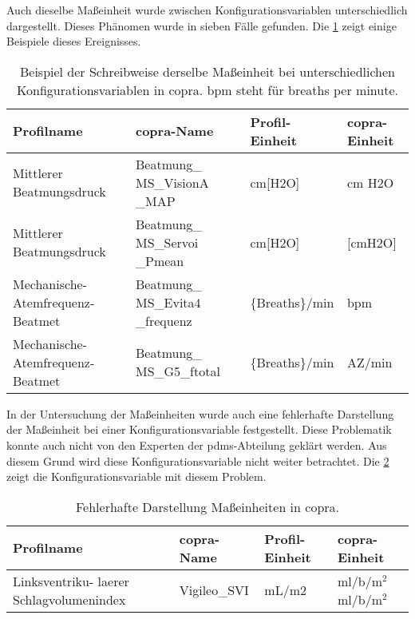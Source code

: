 Auch dieselbe Maßeinheit wurde zwischen Konfigurationsvariablen unterschiedlich dargestellt. Dieses Phänomen wurde in sieben Fälle gefunden. Die \ref{tab:unitscopra} zeigt einige Beispiele dieses Ereignisses.

\clearpage

\begin{table}[ht]
	\centering
	\caption[Beispiel der Schreibweise derselbe Maßeinheit in \acs{copra}]{Beispiel der Schreibweise derselbe Maßeinheit bei unterschiedlichen Konfigurationsvariablen in \acs{copra}. bpm steht für \glqq breaths per minute\grqq{}.}
	\label{tab:unitscopra}
	\begin{tabular}{|p{3cm}|p{3cm}|l|l|} \hline
		\bfseries Profilname & \bfseries \ac{copra}-Name & \bfseries Profil-Einheit &  \bfseries \ac{copra}-Einheit \\ \hline
		Mittlerer Beatmungsdruck & Beatmung\_ MS\_VisionA \_MAP & cm[H2O] & cm H2O \\ \hline
		Mittlerer Beatmungsdruck & Beatmung\_ MS\_Servoi \_Pmean & cm[H2O] & [cmH2O] \\ \hline \hline
		Mechanische-Atemfrequenz-Beatmet & Beatmung\_ MS\_Evita4 \_frequenz & \{Breaths\}/min & bpm \\ \hline
		Mechanische-Atemfrequenz-Beatmet & Beatmung\_ MS\_G5\_ftotal & \{Breaths\}/min & AZ/min \\ \hline
	\end{tabular}
\end{table}

In der Untersuchung der Maßeinheiten wurde auch eine fehlerhafte Darstellung der Maßeinheit bei einer Konfigurationsvariable festgestellt. Diese Problematik konnte auch nicht von den Experten der \ac{pdms}-Abteilung geklärt werden. Aus diesem Grund wird diese Konfigurationsvariable nicht weiter betrachtet. Die \ref{tab:errounit} zeigt die Konfigurationsvariable mit diesem Problem.


\begin{table}[ht]
	\centering
	\caption[Fehlerhafte Darstellung Maßeinheiten in \acs{copra}]{Fehlerhafte Darstellung Maßeinheiten in \acs{copra}.}
	\label{tab:errounit}
	\begin{tabular}{|p{3cm}|p{3cm}|l|l|} \hline
		\bfseries Profilname & \bfseries \ac{copra}-Name & \bfseries Profil-Einheit & \bfseries \ac{copra}-Einheit \\ \hline
		Linksventriku- laerer Schlagvolumenindex & Vigileo\_SVI & mL/m2 & ml/b/m$^2$ml/b/m$^2$ \\ \hline
	\end{tabular}
\end{table}

